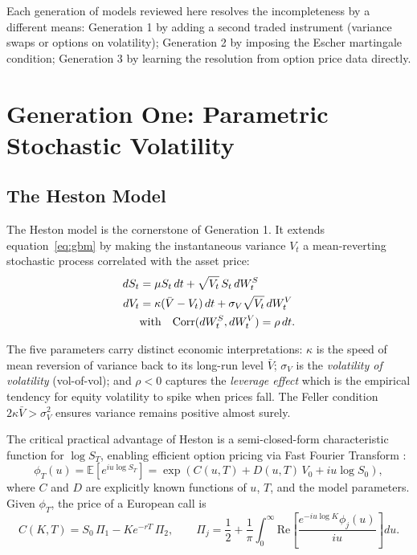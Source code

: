\documentclass[12pt, a4paper]{article}
\begin{document}
Each generation of models reviewed here resolves the incompleteness by
a different means: Generation 1 by adding a second traded instrument
(variance swaps or options on volatility); Generation 2 by imposing
the Escher martingale condition; Generation 3 by learning the
resolution from option price data directly.

\newpage
\section{Generation One: Parametric Stochastic Volatility}

\subsection{The Heston Model}

The Heston model \citep{heston1993} is the cornerstone of Generation 1.
It extends equation~\eqref{eq:gbm} by making the instantaneous variance
$V_t$ a mean-reverting stochastic process correlated with the asset
price:
\begin{align}
  dS_t &= \mu S_t\,dt + \sqrt{V_t}\,S_t\,dW_t^S \label{eq:heston_s}\\
  dV_t &= \kappa(\bar{V} - V_t)\,dt + \sigma_V\sqrt{V_t}\,dW_t^V
          \label{eq:heston_v}\\
  &\text{with}\quad \mathrm{Corr}(dW_t^S, dW_t^V) = \rho\,dt.
          \notag
\end{align}

The five parameters carry distinct economic interpretations:
$\kappa$ is the speed of mean reversion of variance back to its
long-run level $\bar{V}$; $\sigma_V$ is the \emph{volatility of
volatility} (vol-of-vol); and $\rho < 0$ captures the
\emph{leverage effect} which is the empirical tendency for equity volatility
to spike when prices fall. The Feller condition $2\kappa\bar{V} >
\sigma_V^2$ ensures variance remains positive almost surely.

The critical practical advantage of Heston is a semi-closed-form
characteristic function for $\log S_T$, enabling efficient option
pricing via Fast Fourier Transform \citep{carr1999fft}:
\begin{equation}
  \phi_T(u) = \mathbb{E}\!\left[e^{iu\log S_T}\right]
  = \exp\!\left(C(u,T) + D(u,T)\,V_0 + iu\log S_0\right),
  \label{eq:heston_cf}
\end{equation}
where $C$ and $D$ are explicitly known functions of $u$, $T$, and the
model parameters. Given $\phi_T$, the price of a European call is
\begin{equation}
  C(K,T) = S_0\,\Pi_1 - K e^{-rT}\,\Pi_2, \qquad
  \Pi_j = \frac{1}{2} + \frac{1}{\pi}\int_0^\infty
  \mathrm{Re}\!\left[\frac{e^{-iu\log K}\phi_j(u)}{iu}\right]du.
  \label{eq:heston_price}
\end{equation}
\end{document}
